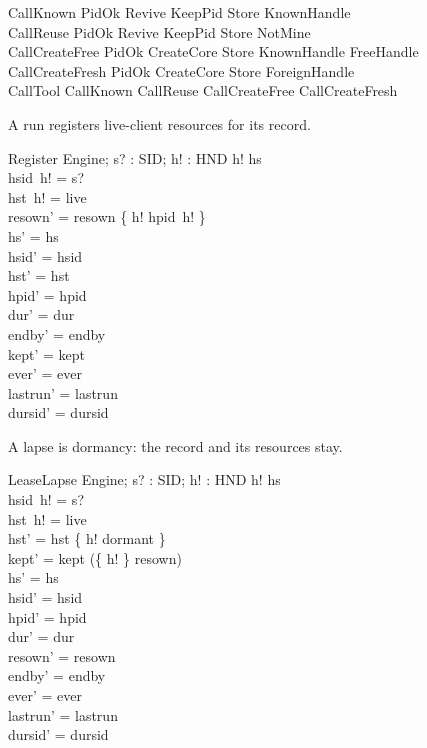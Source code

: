 \documentclass[a4paper,10pt,fleqn]{article}
\begin{document}
\begin{zed}
  CallKnown  PidOk \land Revive \land KeepPid \land Store \land KnownHandle \\
  CallReuse  PidOk \land Revive \land KeepPid \land Store \land NotMine \\
  CallCreateFree 
    PidOk \land CreateCore \land Store \land KnownHandle \land FreeHandle \\
  CallCreateFresh  PidOk \land CreateCore \land Store \land ForeignHandle \\
  CallTool  CallKnown \lor CallReuse \lor CallCreateFree \lor CallCreateFresh
\end{zed}

A run registers live-client resources for its record.

\begin{schema}{Register}
  \Delta Engine; s? : SID; h! : HND
\where
  h! \in hs \\
  hsid~h! = s? \\
  hst~h! = live \\
  resown' = resown \oplus \{ h! \mapsto hpid~h! \} \\
  hs' = hs \\
  hsid' = hsid \\
  hst' = hst \\
  hpid' = hpid \\
  dur' = dur \\
  endby' = endby \\
  kept' = kept \\
  ever' = ever \\
  lastrun' = lastrun \\
  dursid' = dursid
\end{schema}

A lapse is dormancy: the record and its resources stay.

\begin{schema}{LeaseLapse}
  \Delta Engine; s? : SID; h! : HND
\where
  h! \in hs \\
  hsid~h! = s? \\
  hst~h! = live \\
  hst' = hst \oplus \{ h! \mapsto dormant \} \\
  kept' = kept \cup (\{ h! \} \cap \dom resown) \\
  hs' = hs \\
  hsid' = hsid \\
  hpid' = hpid \\
  dur' = dur \\
  resown' = resown \\
  endby' = endby \\
  ever' = ever \\
  lastrun' = lastrun \\
  dursid' = dursid
\end{schema}
\end{document}
